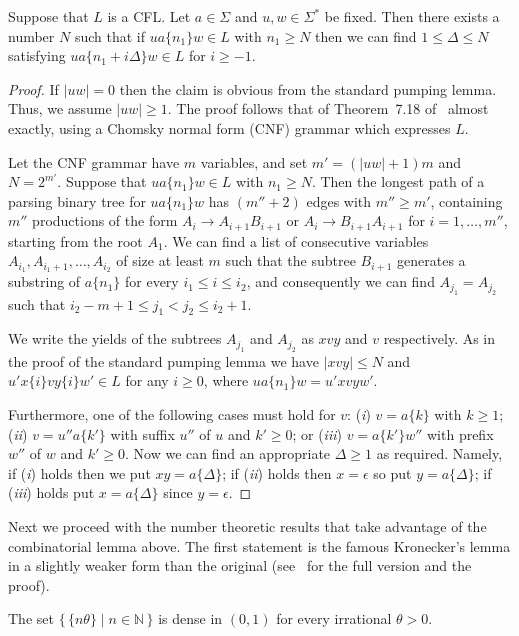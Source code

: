 \documentclass[12pt]{article}
\begin{document}
\begin{lemma}\label{cycle}
Suppose that $L$ is a CFL.
Let $a\in\Sigma$ and $u,w\in\Sigma^*$ be fixed.
Then there exists a number $N$ such that
if $ua\{n_1\}w\in L$ with $n_1 \ge N$ then
we can find $1 \le \Delta \le N$ satisfying
$ua\{n_1+i\Delta\}w\in L$ for $i \ge -1$.
\end{lemma}
\begin{proof}
If $|uw| = 0$
then the claim is obvious from the standard pumping lemma.
Thus, we assume $|uw| \ge 1$.
The proof follows that of Theorem~7.18
of~\cite{hum} almost exactly, 
using a Chomsky normal form (CNF) grammar which expresses $L$.

Let the CNF grammar have $m$ variables,
and set $m' = (|uw|+1)m$ and $N = 2^{m'}$.
Suppose that $ua\{n_1\}w\in L$ with $n_1 \ge N$.
Then the longest path of a parsing binary tree for $ua\{n_1\}w$
has $(m''+2)$ edges with $m'' \ge m'$,
containing $m''$ productions
of the form $A_{i} \to A_{i+1}B_{i+1}$
or $A_{i} \to B_{i+1}A_{i+1}$ for $i=1,\ldots,m''$,
starting from the root $A_1$.
We can find 
a list of consecutive variables
$A_{i_1},A_{i_1+1},\ldots,A_{i_2}$ of size at least $m$
such that the subtree $B_{i+1}$ generates a substring of $a\{n_1\}$
for every $i_1 \le i \le i_2$,
and consequently we can find $A_{j_1} = A_{j_2}$
such that $i_2-m+1 \le j_1 < j_2 \le i_2+1$.


We write the yields of the subtrees $A_{j_1}$
and $A_{j_2}$ as $xvy$ and $v$ respectively.
As in the proof of the standard pumping lemma we have
$|xvy| \le N$ and $u'x\{i\}vy\{i\}w'\in L$ for any $i \ge 0$,
where $ua\{n_1\}w = u'xvyw'$.

Furthermore, one of the following cases must hold for $v$:
({\it i\/}) $v = a\{k\}$ with $k \ge 1$;
({\it ii\/}) $v = u''a\{k'\}$ with suffix $u''$ of $u$ and $k' \ge 0$;
or
({\it iii\/}) $v = a\{k'\}w''$ with prefix $w''$ of $w$ and $k' \ge 0$.
Now we can find an appropriate $\Delta \ge 1$
as required. Namely,
if ({\it i\/}) holds then we put $xy = a\{\Delta\}$;
if ({\it ii\/}) holds then $x = \epsilon$ so put $y = a\{\Delta\}$;
if ({\it iii\/}) holds put $x = a\{\Delta\}$ since $y = \epsilon$.
\end{proof}

Next we proceed with the number theoretic results that take advantage
of the combinatorial lemma above. The first statement is the
famous Kronecker's lemma in a slightly weaker form than the original
(see~\cite{Hardy} for the full version and the proof).

\begin{lemma} The set
  $\{\,\{n\theta\}\mid n\in{\mathbb N}\,\}$ is dense in $(0,1)$ for
  every irrational $\theta>0$.
\end{lemma}
\end{document}
